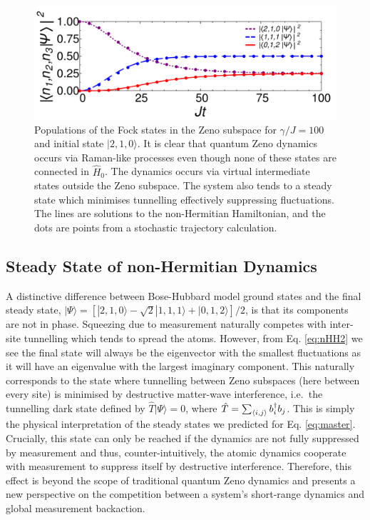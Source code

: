 \begin{figure}[hbtp!]
	\includegraphics[width=\linewidth]{comp}
	\caption[Fock State Populations in a Zeno
        Subspace]{Populations of the Fock states in the Zeno subspace
          for $\gamma/J = 100$ and initial state $| 2,1,0 \rangle$. It
          is clear that quantum Zeno dynamics occurs via Raman-like
          processes even though none of these states are connected in
          $\hat{H}_0$. The dynamics occurs via virtual intermediate
          states outside the Zeno subspace. The system also tends to a
          steady state which minimises tunnelling effectively
          suppressing fluctuations. The lines are solutions to the
          non-Hermitian Hamiltonian, and the dots are points from a
          stochastic trajectory calculation.\label{fig:comp}}
\end{figure}

\subsection{Steady State of non-Hermitian Dynamics}

A distinctive difference between Bose-Hubbard model ground states and
the final steady state,
$| \Psi \rangle = [|2,1,0 \rangle - \sqrt{2} |1,1,1\rangle +
|0,1,2\rangle]/2$, is that its components are not in phase. Squeezing
due to measurement naturally competes with inter-site tunnelling which
tends to spread the atoms. However, from Eq. \eqref{eq:nHH2} we see
the final state will always be the eigenvector with the smallest
fluctuations as it will have an eigenvalue with the largest imaginary
component. This naturally corresponds to the state where tunnelling
between Zeno subspaces (here between every site) is minimised by
destructive matter-wave interference, i.e.~the tunnelling dark state
defined by $\hat{T} |\Psi \rangle = 0$, where
$\hat{T} = \sum_{\langle i, j \rangle} b^\dagger_i b_j$. This is simply the
physical interpretation of the steady states we predicted for
Eq. \eqref{eq:master}. Crucially, this state can only be reached if
the dynamics are not fully suppressed by measurement and thus,
counter-intuitively, the atomic dynamics cooperate with measurement to
suppress itself by destructive interference. Therefore, this effect is
beyond the scope of traditional quantum Zeno dynamics and presents a
new perspective on the competition between a system's short-range
dynamics and global measurement backaction.

